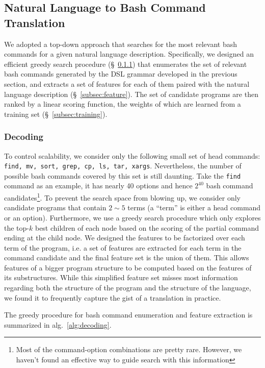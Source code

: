 \subsection{Natural Language to Bash Command Translation}
\label{subsec:parser}

We adopted a top-down approach that searches for the most relevant bash commands for a given natural language description. Specifically, we designed an efficient greedy search procedure (\S~\ref{subsec:decoding}) that enumerates the set of relevant bash commands generated by the DSL grammar developed in the previous section, and extracts a set of features for each of them paired with the natural language description (\S~\ref{subsec:feature}). The set of candidate programs are then ranked by a linear scoring function, the weights of which are learned from a training set (\S~\ref{subsec:training}). 

\subsubsection{Decoding}
\label{subsec:decoding}

To control scalability, we consider only the following small set of head commands: \texttt{find, mv, sort, grep, cp, ls, tar, xargs}. Nevertheless, the number of possible bash commands covered by this set is still daunting. Take the \texttt{find} command as an example, it has nearly 40 options and hence $2^{40}$ bash command candidates\footnote{Most of the command-option combinations are pretty rare. However, we haven't found an effective way to guide search with this information}. To prevent the search space from blowing up, we consider only candidate programs that contain $2\sim 5$ terms (a ``term'' is either a head command or an option). Furthermore, we use a greedy search procedure which only explores the top-$k$ best children of each node based on the scoring of the partial command ending at the child node. We designed the features to be factorized over each term of the program, i.e. a set of features are extracted for each term in the command candidate and the final feature set is the union of them. This allows features of a bigger program structure to be computed based on the features of its substructures. While this simplified feature set misses most information regarding both the structure of the program and the structure of the language, we found it to frequently capture the gist of a translation in practice. 

The greedy procedure for bash command enumeration and feature extraction is summarized in alg.~\ref{alg:decoding}.

